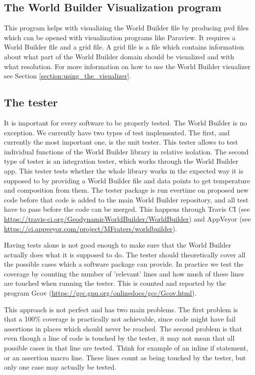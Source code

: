 \documentclass{book}
\newcommand{\WB}{{World Builder}}
\newcommand{\paraview}{{Paraview}}
\newcommand{\gcov}{{Gcov}}
\begin{document}
\subsection{The World Builder Visualization program}
This program helps with visualizing the \WB{} file by producing pvd files which can be opened with visualization programs like \paraview{}. It requires a \WB{} file and a grid file. A grid file is a file which contains information about what part of the \WB{} domain should be visualized and with what resolution. For more information on how to use the World Builder visualizer see Section \ref{section:using_the_visualizer}.

\subsection{The tester}

It is important for every software to be properly tested. The \WB{} is no exception. We currently have two types of test implemented. The first, and currently the most important one, is the unit tester. This tester allows to test individual functions of the \WB{} library in relative isolation. The second type of tester is an integration tester, which works through the \WB{} app. This tester tests whether the whole library works in the expected way it is supposed to by providing a \WB{} file and data points to get temperature and composition from them. The tester package is run evertime on proposed new code before that code is added to the main \WB{} repository, and all test have to pass before the code can be merged. This happens through Travis CI (see \url{https://travis-ci.org/GeodynamicWorldBuilder/WorldBuilder}) and AppVeyor (see \url{https://ci.appveyor.com/project/MFraters/worldbuilder}).

Having tests alone is not good enough to make sure that the \WB{} actually does what it is supposed to do. The tester should theoretically cover all the possible cases which a software package can provide. In practice we test the coverage by counting the number of 'relevant' lines and how much of these lines are touched when running the tester. This is counted and reported by the program \gcov{} (\url{https://gcc.gnu.org/onlinedocs/gcc/Gcov.html}).

This approach is not perfect and has two main problems. The first problem is that a 100\% coverage is practically not achievable, since code might have fail assertions in places which should never be reached. The second problem is that even though a line of code is touched by the tester, it may not mean that all possible cases in that line are tested. Think for example of an inline if statement, or an assertion macro line. These lines count as being touched by the tester, but only one case may actually be tested.
\end{document}
